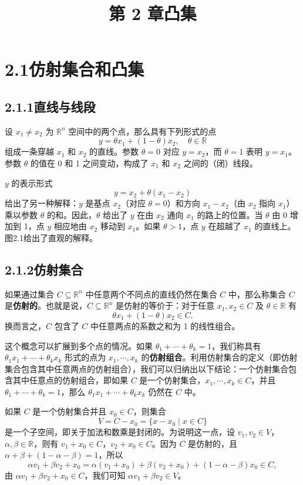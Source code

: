 \documentclass[UTF8,12pt,a4paper,fontset=fandol]{ctexart}
\title{第 2 章\quad 凸集}
\author{}
\date{}
\begin{document}
\maketitle

\section*{2.1\quad 仿射集合和凸集}

\subsection*{2.1.1\quad 直线与线段}

设 $x_1\ne x_2$ 为 $\mathbb{R}^n$ 空间中的两个点，那么具有下列形式的点
\[
  y=\theta x_1+(1-\theta)x_2,\quad \theta\in\mathbb{R}
\]
组成一条穿越 $x_1$ 和 $x_2$ 的直线。参数 $\theta=0$ 对应 $y=x_2$，而 $\theta=1$ 表明 $y=x_1$。参数 $\theta$ 的值在 0 和 1 之间变动，构成了 $x_1$ 和 $x_2$ 之间的（闭）线段。

$y$ 的表示形式
\[
  y=x_2+\theta(x_1-x_2)
\]
给出了另一种解释：$y$ 是基点 $x_2$（对应 $\theta=0$）和方向 $x_1-x_2$（由 $x_2$ 指向 $x_1$）乘以参数 $\theta$ 的和。因此，$\theta$ 给出了 $y$ 在由 $x_2$ 通向 $x_1$ 的路上的位置。当 $\theta$ 由 0 增加到 1，点 $y$ 相应地由 $x_2$ 移动到 $x_1$。如果 $\theta>1$，点 $y$ 在超越了 $x_1$ 的直线上。图2.1给出了直观的解释。

\subsection*{2.1.2\quad 仿射集合}

如果通过集合 $C\subseteq\mathbb{R}^n$ 中任意两个不同点的直线仍然在集合 $C$ 中，那么称集合 $C$ 是\textbf{仿射的}。也就是说，$C\subseteq\mathbb{R}^n$ 是仿射的等价于：对于任意 $x_1,x_2\in C$ 及 $\theta\in\mathbb{R}$ 有
\[
  \theta x_1+(1-\theta)x_2\in C.
\]
换而言之，$C$ 包含了 $C$ 中任意两点的系数之和为 1 的线性组合。

这个概念可以扩展到多个点的情况。如果 $\theta_1+\cdots+\theta_k=1$，我们称具有 $\theta_1x_1+\cdots+\theta_kx_k$ 形式的点为 $x_1,\cdots,x_k$ 的\textbf{仿射组合}。利用仿射集合的定义（即仿射集合包含其中任意两点的仿射组合），我们可以归纳出以下结论：一个仿射集合包含其中任意点的仿射组合，即如果 $C$ 是一个仿射集合，$x_1,\cdots,x_k\in C$，并且 $\theta_1+\cdots+\theta_k=1$，那么 $\theta_1x_1+\cdots+\theta_kx_k$ 仍然在 $C$ 中。

如果 $C$ 是一个仿射集合并且 $x_0\in C$，则集合
\[
  V=C-x_0=\{x-x_0\mid x\in C\}
\]
是一个子空间，即关于加法和数乘是封闭的。为说明这一点，设 $v_1,v_2\in V$，$\alpha,\beta\in\mathbb{R}$，则有 $v_1+x_0\in C$，$v_2+x_0\in C$。因为 $C$ 是仿射的，且 $\alpha+\beta+(1-\alpha-\beta)=1$，所以
\[
  \alpha v_1+\beta v_2+x_0
  =\alpha(v_1+x_0)+\beta(v_2+x_0)+(1-\alpha-\beta)x_0\in C,
\]
由 $\alpha v_1+\beta v_2+x_0\in C$，我们可知 $\alpha v_1+\beta v_2\in V$。
\end{document}
